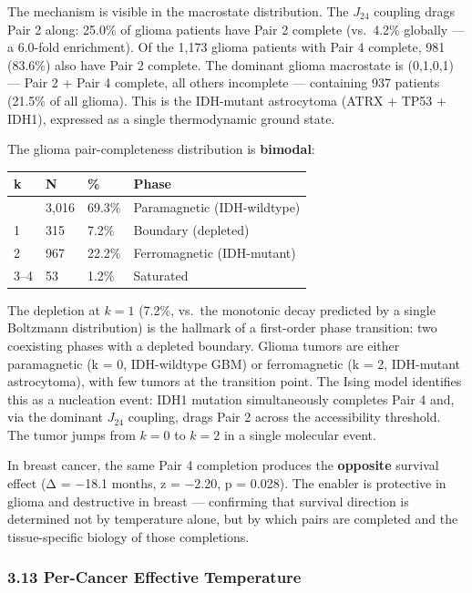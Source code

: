 \documentclass[
  11pt,
]{article}
\newcounter{none} %
\begin{document}
The mechanism is visible in the macrostate distribution. The \(J_{24}\)
coupling drags Pair 2 along: 25.0\% of glioma patients have Pair 2
complete (vs.~4.2\% globally --- a 6.0-fold enrichment). Of the 1,173
glioma patients with Pair 4 complete, 981 (83.6\%) also have Pair 2
complete. The dominant glioma macrostate is (0,1,0,1) --- Pair 2 + Pair
4 complete, all others incomplete --- containing 937 patients (21.5\% of
all glioma). This is the IDH-mutant astrocytoma (ATRX + TP53 + IDH1),
expressed as a single thermodynamic ground state.

The glioma pair-completeness distribution is \textbf{bimodal}:

{\def\LTcaptype{none} %
\begin{longtable}[]{@{}llll@{}}
\toprule\noalign{}
k & N & \% & Phase \\
\midrule\noalign{}
\endhead
\bottomrule\noalign{}
\endlastfoot
0 & 3,016 & 69.3\% & Paramagnetic (IDH-wildtype) \\
1 & 315 & 7.2\% & Boundary (depleted) \\
2 & 967 & 22.2\% & Ferromagnetic (IDH-mutant) \\
3--4 & 53 & 1.2\% & Saturated \\
\end{longtable}
}

The depletion at \(k = 1\) (7.2\%, vs.~the monotonic decay predicted by
a single Boltzmann distribution) is the hallmark of a first-order phase
transition: two coexisting phases with a depleted boundary. Glioma
tumors are either paramagnetic (k = 0, IDH-wildtype GBM) or
ferromagnetic (k = 2, IDH-mutant astrocytoma), with few tumors at the
transition point. The Ising model identifies this as a nucleation event:
IDH1 mutation simultaneously completes Pair 4 and, via the dominant
\(J_{24}\) coupling, drags Pair 2 across the accessibility threshold.
The tumor jumps from \(k = 0\) to \(k = 2\) in a single molecular event.

In breast cancer, the same Pair 4 completion produces the
\textbf{opposite} survival effect (Δ = −18.1 months, z = −2.20, p =
0.028). The enabler is protective in glioma and destructive in breast
--- confirming that survival direction is determined not by temperature
alone, but by which pairs are completed and the tissue-specific biology
of those completions.

\subsubsection{3.13 Per-Cancer Effective
Temperature}\label{per-cancer-effective-temperature}
\end{document}
